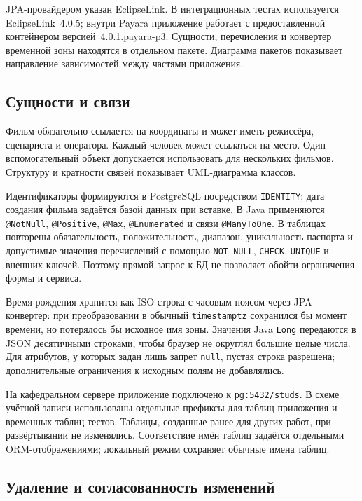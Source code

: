 JPA-провайдером указан EclipseLink. В интеграционных тестах используется EclipseLink~4.0.5; внутри Payara приложение работает с предоставленной контейнером версией~4.0.1.payara-p3. Сущности, перечисления и конвертер временной зоны находятся в отдельном пакете. Диаграмма пакетов показывает направление зависимостей между частями приложения.



\subsection{Сущности и связи}

Фильм обязательно ссылается на координаты и может иметь режиссёра, сценариста и оператора. Каждый человек может ссылаться на место. Один вспомогательный объект допускается использовать для нескольких фильмов. Структуру и кратности связей показывает UML-диаграмма классов.



Идентификаторы формируются в PostgreSQL посредством \texttt{IDENTITY}; дата создания фильма задаётся базой данных при вставке. В Java применяются \texttt{@NotNull}, \texttt{@Positive}, \texttt{@Max}, \texttt{@Enumerated} и связи \texttt{@ManyToOne}. В таблицах повторены обязательность, положительность, диапазон, уникальность паспорта и допустимые значения перечислений с помощью \texttt{NOT NULL}, \texttt{CHECK}, \texttt{UNIQUE} и внешних ключей. Поэтому прямой запрос к БД не позволяет обойти ограничения формы и сервиса.

Время рождения хранится как ISO-строка с часовым поясом через JPA-конвертер: при преобразовании в обычный \texttt{timestamptz} сохранился бы момент времени, но потерялось бы исходное имя зоны. Значения Java \texttt{Long} передаются в JSON десятичными строками, чтобы браузер не округлял большие целые числа. Для атрибутов, у которых задан лишь запрет \texttt{null}, пустая строка разрешена; дополнительные ограничения к исходным полям не добавлялись.

На кафедральном сервере приложение подключено к \texttt{pg:5432/studs}. В схеме учётной записи использованы отдельные префиксы для таблиц приложения и временных таблиц тестов. Таблицы, созданные ранее для других работ, при развёртывании не изменялись. Соответствие имён таблиц задаётся отдельными ORM-отображениями; локальный режим сохраняет обычные имена таблиц.

\subsection{Удаление и согласованность изменений}

